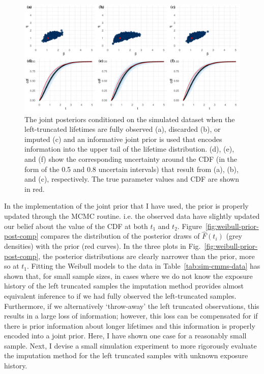 \begin{figure}
    \centering
    \includegraphics[width=1\textwidth]{./figures/ch-2/joint-posts-inf.pdf}
    \caption{The joint posteriors conditioned on the simulated dataset when the left-truncated lifetimes are fully observed (a), discarded (b), or imputed (c) and an informative joint prior is used that encodes information into the upper tail of the lifetime distribution. (d), (e), and (f) show the corresponding uncertainty around the CDF (in the form of the 0.5 and 0.8 uncertain intervals) that result from (a), (b), and (c), respectively. The true parameter values and CDF are shown in red.}
    \label{fig:joint-post-weibull-inf}
\end{figure}

In the implementation of the joint prior that I have used, the prior is properly updated through the MCMC routine. i.e. the observed data have slightly updated our belief about the value of the CDF at both $t_1$ and $t_2$. Figure~\ref{fig:weibull-prior-post-comp} compares the distribution of the posterior draws of $\hat{F}(t_i)$ (grey densities) with the prior (red curves). In the three plots in Fig.~\ref{fig:weibull-prior-post-comp}, the posterior distributions are clearly narrower than the prior, more so at $t_1$. Fitting the Weibull models to the data in Table~\ref{tab:sim-cmms-data} has shown that, for small sample sizes, in cases where we do not know the exposure history of the left truncated samples the imputation method provides almost equivalent inference to if we had fully observed the left-truncated samples. Furthermore, if we alternatively `throw-away' the left truncated observations, this results in a large loss of information; however, this loss can be compensated for if there is prior information about longer lifetimes and this information is properly encoded into a joint prior. Here, I have shown one case for a reasonably small sample. Next, I devise a small simulation experiment to more rigorously evaluate the imputation method for the left truncated samples with unknown exposure history.

